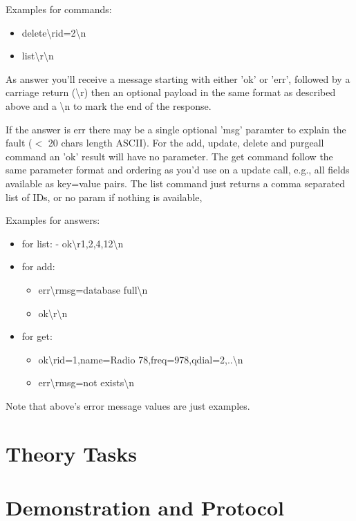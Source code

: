 \documentclass[a4paper,10pt]{article}
\begin{document}
Examples for commands:
\begin{itemize}
\item delete\textbackslash rid=2\textbackslash n
\item list\textbackslash r\textbackslash n
\end{itemize}
As answer you'll receive a message starting with either 'ok' or 'err', followed
by a carriage return (\textbackslash r) then an optional payload in the same format as described
above and a \textbackslash n to mark the end of the response.

If the answer is err there may be a single optional 'msg' paramter to explain the fault
($<$ 20 chars length ASCII).
For the add, update, delete and purgeall command an 'ok' result will have no parameter.
The get command follow the same parameter format and ordering as you'd use on a update
call, e.g., all fields available as key=value pairs.
The list command just returns a comma separated list of IDs, or no param if nothing
is available,

Examples for answers:
\begin{itemize}
\item for list:
  - ok\textbackslash r1,2,4,12\textbackslash n

\item for add:
\begin{itemize}
  \item  err\textbackslash rmsg=database full\textbackslash n\\
 \item ok\textbackslash r\textbackslash n
\end{itemize}
\item for get:
\begin{itemize}
  \item ok\textbackslash rid=1,name=Radio 78,freq=978,qdial=2,..\textbackslash n\\
  \item err\textbackslash rmsg=not exists\textbackslash n
\end{itemize}
\end{itemize}
Note that above's error message values are just examples. 

\section{Theory Tasks}



\section{Demonstration and Protocol}
\end{document}
